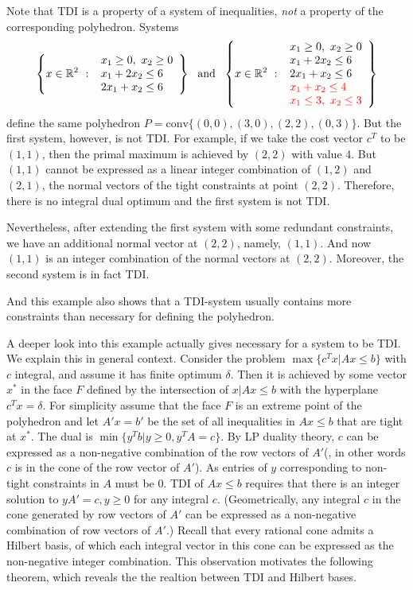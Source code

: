 \documentclass{article}
\def\R{{\mathbb R}}
\begin{document}
Note that TDI is a property of a system of inequalities, \emph{not} a property of the corresponding polyhedron. Systems
\[
\left\{ x\in \R^2~:~
\begin{array}{l}    
    x_1\geq 0,~x_2\geq 0\\
    x_1+2x_2\leq 6\\
    2x_1+x_2\leq 6
\end{array}
\right\}
~~\mbox{and}~~
\left\{ x\in \R^2~:~
\begin{array}{l}    
    x_1\geq 0,~x_2\geq 0\\
    x_1+2x_2\leq 6\\
    2x_1+x_2\leq 6\\
    {\color{red} x_1+x_2\leq 4}\\
    {\color{red} x_1\leq 3,~x_2\leq 3}
\end{array}
\right\}
\]
define the same polyhedron $P=\mbox{conv}\{(0,0),(3,0),(2,2),(0,3)\}$. But the first system, however, is not TDI. For example, if we take the cost vector $c^T$ to be $(1,1)$, then the primal maximum is achieved by $(2,2)$ with value $4$. But $(1,1)$ cannot be expressed as a linear integer combination of $(1,2)$ and $(2,1)$, the normal vectors of the tight constraints at point $(2,2)$. Therefore, there is no integral dual optimum and the first system is not TDI.

Nevertheless, after extending the first system with some redundant constraints, we have an additional normal vector at $(2,2)$, namely, $(1,1)$. And now $(1,1)$ is an integer combination of the normal vectors at $(2,2)$. Moreover, the second system is in fact TDI.

And this example also shows that a TDI-system usually contains more constraints than necessary for defining the polyhedron.

A deeper look into this example actually gives necessary for a system to be TDI. We explain this in general context. Consider the problem $\max\{c^T x|Ax\leq b\}$ with $c$ integral, and assume it has finite optimum $\delta$. Then it is achieved by some vector $x^*$ in the face $F$ defined by the intersection of $x|Ax\leq b$ with the hyperplane $c^T x=\delta$. For simplicity assume that the face $F$ is an extreme point of the polyhedron and let $A'x=b'$ be the set of all inequalities in $Ax\leq b$ that are tight at $x^*$. The dual is $\min\{y^T b|y\geq 0, y^T A=c\}$. By LP duality theory, $c$ can be expressed as a non-negative combination of the row vectors of $A'$(, in other words $c$ is in the cone of the row vector of $A'$). As entries of $y$ corresponding to non-tight constraints in $A$ must be $0$. TDI of $Ax\leq b$ requires that there is an integer solution to $yA'=c,y\geq 0$ for any integral $c$. (Geometrically, any integral $c$ in the cone generated by row vectors of $A'$ can be expressed as a non-negative combination of row vectors of $A'$.) Recall that every rational cone admits a Hilbert basis, of which each integral vector in this cone can be expressed as the non-negative integer combination. This observation motivates the following theorem, which reveals the the realtion between TDI and Hilbert bases.
\end{document}
